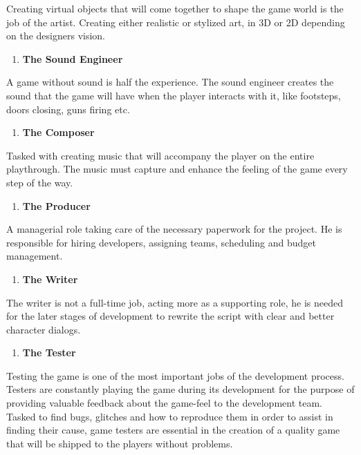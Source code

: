 \documentclass[a4paper,one side,12pt]{book}
\begin{document}
Creating virtual objects that will come together to shape the game world
is the job of the artist. Creating either realistic or stylized art, in
3D or 2D depending on the designers\textquotesingle{} vision.

\begin{enumerate}
\def\labelenumi{\arabic{enumi}.}
\setcounter{enumi}{2}
\item
  \textbf{The Sound Engineer}
\end{enumerate}

A game without sound is half the experience. The sound engineer creates
the sound that the game will have when the player interacts with it,
like footsteps, doors closing, guns firing etc.

\begin{enumerate}
\def\labelenumi{\arabic{enumi}.}
\setcounter{enumi}{3}
\item
  \textbf{The Composer}
\end{enumerate}

Tasked with creating music that will accompany the player on the entire
playthrough. The music must capture and enhance the feeling of the game
every step of the way.

\begin{enumerate}
\def\labelenumi{\arabic{enumi}.}
\setcounter{enumi}{4}
\item
  \textbf{The Producer}
\end{enumerate}

A managerial role taking care of the necessary paperwork for the
project. He is responsible for hiring developers, assigning teams,
scheduling and budget management.

\begin{enumerate}
\def\labelenumi{\arabic{enumi}.}
\setcounter{enumi}{5}
\item
  \textbf{The Writer}
\end{enumerate}

The writer is not a full-time job, acting more as a supporting role, he
is needed for the later stages of development to rewrite the script with
clear and better character dialogs.

\begin{enumerate}
\def\labelenumi{\arabic{enumi}.}
\setcounter{enumi}{6}
\item
  \textbf{The Tester}
\end{enumerate}

Testing the game is one of the most important jobs of the development
process. Testers are constantly playing the game during its development
for the purpose of providing valuable feedback about the game-feel to
the development team. Tasked to find bugs, glitches and how to reproduce
them in order to assist in finding their cause, game testers are
essential in the creation of a quality game that will be shipped to the
players without problems.
\end{document}
